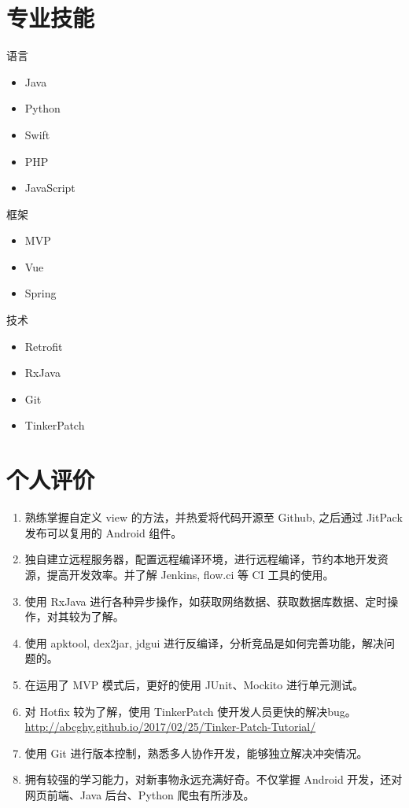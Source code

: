 \documentclass[11pt]{res}
\begin{document}
\begin{resume}
\section{专业技能}
  \begin{multicols}{3}
    语言
    \begin{itemize}
      \item Java
      \item Python
      \item Swift
      \item PHP
      \item JavaScript
    \end{itemize}
    框架
    \begin{itemize}
      \item MVP
      \item Vue
      \item Spring
    \end{itemize}
    技术
    \begin{itemize}
      \item Retrofit
      \item RxJava
      \item Git
      \item TinkerPatch
    \end{itemize}
  \end{multicols}

\section{个人评价}
  \begin{enumerate}
      \item 熟练掌握自定义 view 的方法，并热爱将代码开源至 Github, 之后通过 JitPack 发布可以复用的 Android 组件。
      \item 独自建立远程服务器，配置远程编译环境，进行远程编译，节约本地开发资源，提高开发效率。并了解 Jenkins, flow.ci 等 CI 工具的使用。
      \item 使用 RxJava 进行各种异步操作，如获取网络数据、获取数据库数据、定时操作，对其较为了解。
      \item 使用 apktool, dex2jar, jdgui 进行反编译，分析竞品是如何完善功能，解决问题的。
      \item 在运用了 MVP 模式后，更好的使用 JUnit、Mockito 进行单元测试。
      \item 对 Hotfix 较为了解，使用 TinkerPatch 使开发人员更快的解决bug。\\ \url{http://abcghy.github.io/2017/02/25/Tinker-Patch-Tutorial/}
      \item 使用 Git 进行版本控制，熟悉多人协作开发，能够独立解决冲突情况。
      \item 拥有较强的学习能力，对新事物永远充满好奇。不仅掌握 Android 开发，还对网页前端、Java 后台、Python 爬虫有所涉及。
  \end{enumerate}

\end{resume}
\end{document}
